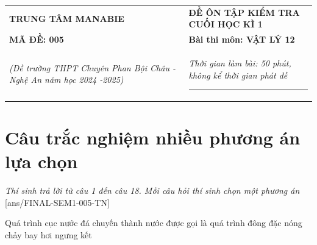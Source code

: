 \begin{tabular}{M{7.5cm}M{10.5cm}}
	\textbf{TRUNG TÂM MANABIE}& \textbf{ĐỀ ÔN TẬP KIỂM TRA CUỐI HỌC KÌ 1}\\
	\textbf{MÃ ĐỀ: 005}& \textbf{Bài thi môn: VẬT LÝ 12}\\
	\textit{(Đề trường THPT Chuyên Phan Bội Châu - Nghệ An  năm học 2024 -2025)}& \textit{Thời gian làm bài: 50 phút, không kể thời gian phát đề}
	
	\noindent\rule{4cm}{0.8pt} \\
\end{tabular}
\setcounter{section}{0}
\section{Câu trắc nghiệm nhiều phương án lựa chọn}
\textit{Thí sinh trả lời từ câu 1 đến câu 18. Mỗi câu hỏi thí sinh chọn một phương án}
\setcounter{ex}{0}
[ans/FINAL-SEM1-005-TN]
\begin{ex}
	Quá trình cục nước đá chuyến thành nước được gọi là quá trình
	\choice
	{đông đặc}
	{\True nóng chảy}
	{bay hơi}
	{ngưng kết}
	\loigiai{}
\end{ex}
